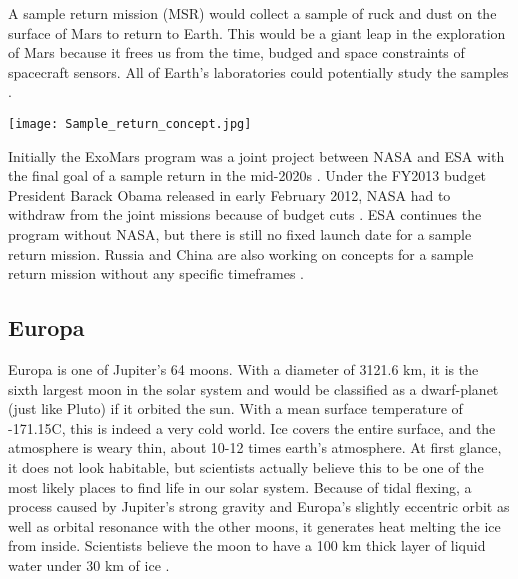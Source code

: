 \begin{multicols}{2}
A sample return mission (MSR) would collect a sample of ruck and dust on the surface of Mars to return to Earth.
This would be a giant leap in the exploration of Mars because it frees us from the time, budged and space constraints of spacecraft sensors.
All of Earth’s laboratories could potentially study the samples \cite{EarthAnalysis}.
 
\begin{center}
	\texttt{[image: Sample\_return\_concept.jpg]}
\end{center}

Initially the ExoMars program was a joint project between NASA and ESA with the final goal of a sample return in the mid-2020s \cite{FPlan15}.
Under the FY2013 budget President Barack Obama released in early February 2012, NASA had to withdraw from the joint missions because of budget cuts \cite{FPlan16}.
ESA continues the program without NASA, but there is still no fixed launch date for a sample return mission.
Russia and China are also working on concepts for a sample return mission without any specific timeframes \cite{RussiaPlan} \cite{ChinaPlan}.

\subsection*{Europa}
 
Europa is one of Jupiter's 64 moons.
With a diameter of 3121.6 km, it is the sixth largest moon in the solar system and would be classified as a dwarf-planet (just like Pluto) if it orbited the sun.
With a mean surface temperature of -171.15\degree C, this is indeed a very cold world.
Ice covers the entire surface, and the atmosphere is weary thin, about 10-12 times earth's atmosphere.
At first glance, it does not look habitable, but scientists actually believe this to be one of the most likely places to find life in our solar system.
Because of tidal flexing, a process caused by Jupiter’s strong gravity and Europa’s slightly eccentric orbit as well as orbital resonance with the other moons, it generates heat melting the ice from inside.
Scientists believe the moon to have a 100 km thick layer of liquid water under 30 km of ice \cite{FPlan03} \cite{FPlan24}.
 

\end{multicols}
